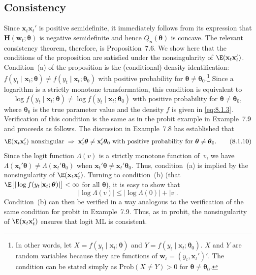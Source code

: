 \subsection*{Consistency}

Since $\mathbf{x}_t \mathbf{x}_t'$ is positive semidefinite, it immediately follows from its expression that
$\mathbf{H}(\mathbf{w}_t; \boldsymbol{\theta})$ is negative semidefinite and hence $Q_n(\boldsymbol{\theta})$ is concave.
The relevant consistency theorem, therefore, is Proposition~7.6. We show here that the conditions
of the proposition are satisfied under the nonsingularity of $\E(\mathbf{x}_t\mathbf{x}_t')$.
Condition~(a) of the proposition is the (conditional) density identification:
$f(y_t \mid \mathbf{x}_t; \boldsymbol{\theta}) \neq f(y_t \mid \mathbf{x}_t; \boldsymbol{\theta}_0)$
with positive probability for $\boldsymbol{\theta} \neq \boldsymbol{\theta}_0$.\footnote{In other words, let
$X = f(y_t \mid \mathbf{x}_t; \boldsymbol{\theta})$ and
$Y = f(y_t \mid \mathbf{x}_t; \boldsymbol{\theta}_0)$. $X$ and $Y$ are random variables because they
are functions of $\mathbf{w}_t = (y_t, \mathbf{x}_t')'$. The condition can be stated simply as
$\text{Prob}(X \neq Y) > 0$ for $\boldsymbol{\theta} \neq \boldsymbol{\theta}_0$.}
Since a logarithm is a strictly monotone transformation, this condition is equivalent to
\begin{equation}
  \log f(y_t \mid \mathbf{x}_t; \boldsymbol{\theta})
  \neq \log f(y_t \mid \mathbf{x}_t; \boldsymbol{\theta}_0)
  \text{ with positive probability for }
  \boldsymbol{\theta} \neq \boldsymbol{\theta}_0,
  \label{eq:8.1.9} \tag{8.1.9}
\end{equation}
where $\boldsymbol{\theta}_0$ is the true parameter value and the density $f$ is given in \eqref{eq:8.1.3}.
Verification of this condition is the same as in the probit example in Example~7.9 and
proceeds as follows. The discussion in Example~7.8 has established that
\begin{equation}
  \E(\mathbf{x}_t\mathbf{x}_t') \text{ nonsingular}
  \;\Rightarrow\;
  \mathbf{x}_t'\boldsymbol{\theta} \neq \mathbf{x}_t'\boldsymbol{\theta}_0
  \text{ with positive probability for }
  \boldsymbol{\theta} \neq \boldsymbol{\theta}_0.
  \label{eq:8.1.10} \tag{8.1.10}
\end{equation}
Since the logit function $\Lambda(v)$ is a strictly monotone function of~$v$, we have
$\Lambda(\mathbf{x}_t'\boldsymbol{\theta}) \neq \Lambda(\mathbf{x}_t'\boldsymbol{\theta}_0)$
when $\mathbf{x}_t'\boldsymbol{\theta} \neq \mathbf{x}_t'\boldsymbol{\theta}_0$.
Thus, condition~(a) is implied by the nonsingularity of $\E(\mathbf{x}_t\mathbf{x}_t')$.
Turning to condition~(b) (that
$\E\bigl[|\log f(y_t | \mathbf{x}_t; \boldsymbol{\theta})|\bigr] < \infty$ for
all $\boldsymbol{\theta}$), it is easy to show that
\begin{equation}
  |\log \Lambda(v)| \leq |\log \Lambda(0)| + |v|.
  \label{eq:8.1.11} \tag{8.1.11}
\end{equation}
Condition~(b) can then be verified in a way analogous to the verification of the
same condition for probit in Example~7.9. Thus, as in probit, the nonsingularity of
$\E(\mathbf{x}_t\mathbf{x}_t')$ ensures that logit ML is consistent.


